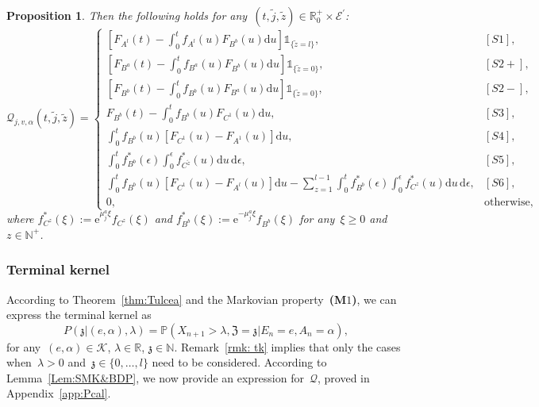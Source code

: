 \documentclass{amsart}[11pt]
\numberwithin{equation}{section}
\newtheorem{proposition}[theorem]{Proposition}
\theoremstyle{definition}
\newtheorem{remark}[theorem]{Remark}
\newcommand{\ind}{\mathds{1}} %
\newcommand{\RR}{\mathbb{R}}
\newcommand{\PP}{\mathbb{P}}
\newcommand{\NN}{\mathbb{N}}
\newcommand{\Kk}{\mathcal{K}}
\newcommand{\D}{\mathrm{d}}
\newcommand{\Ee}{\mathcal{E}}
\newcommand{\E}{\mathrm{e}}
\newcommand{\ZZ}{\mathfrak{Z}}
\newcommand{\zz}{\mathfrak{z}}
\newcommand{\Qq}{\mathcal{Q}}
\begin{document}
\begin{proposition}
Then the following holds for any~$(t, \tilde{j}, \tilde{z})\in\RR^+_0\times \Ee^\prime$:
\begin{equation*}
\Qq_{j, v, \alpha}\left(t, \tilde{j}, \tilde{z}\right)
 = 
\left\{
\begin{array}{ll}
\displaystyle\left[F_{{A}^{l}}(t) - \int_0^t f_{{A}^{l}}(u) F_{{B}^b}(u) \D u\right]
\ind_{\{\tilde{z} = {l}\}}, & [S1],\\
\displaystyle \left[F_{{B}^a}(t) - \int_0^t f_{{B}^a}(u)F_{{B}^b}(u)\D u\right]
\ind_{\{\tilde{z} = 0\}}, 
&  [S2+],\\
\displaystyle \left[F_{{B}^b}(t) - \displaystyle \int_0^t f_{{B}^b}(u) F_{{B}^a}(u)\D u\right]
\ind_{\{\tilde{z} = 0\}}, 
&   [S2-],\\
\displaystyle F_{{B}^b}(t) - \int_0^t f_{{B}^b}(u) F_{{C}^{1}}(u) \D u, &  [S3],\\
\displaystyle \int_0^t f_{{B}^b}(u)\left[F_{{C}^{1}}(u) - F_{{A}^{1}}(u)\right]\D u, &  [S4],\\
\displaystyle \int_0^t f^*_{B^b}(\epsilon)\int_0^\epsilon f^*_{C^{\tilde{z}}}(u)\D u\, \D\epsilon, &  [S5],\\
\displaystyle\int_0^t f_{{B}^b}(u)\left[F_{C^1}(u) - F_{A^l}(u)\right]\D u-
\displaystyle\sum_{z = 1}^{{l}-1}
\int_0^t f^*_{B^b}(\epsilon)\int_0^\epsilon f^*_{C^{z}}(u)\D u\, \D\epsilon, &  [S6],\\
0,&\text{otherwise},
\end{array}
\right.
\end{equation*}
where 
$f^{*}_{{C}^{{z}}}(\xi) := \E^{\mu_{{j}}^a \xi}f_{{C}^{{z}}}(\xi)$ 
and 
$f^{*}_{{B}^b}(\xi) := \E^{-\mu_{{j}}^a \xi}f_{{B}^b}(\xi)$
for any~$\xi\geq 0$ and~$z\in\NN^+$.
\end{proposition}
\subsubsection{Terminal kernel}
According to Theorem~\ref{thm:Tulcea} and the Markovian property~\textbf{(M$1$)},
we can express the terminal kernel as
\begin{equation}
P(\zz\lvert (e, \alpha), \lambda) = 
\PP(X_{n+1} > \lambda, \ZZ = \zz\lvert E_n = e, A_n = \alpha),
\end{equation}
for any~$(e, \alpha)\in \Kk$, $\lambda\in\RR$, $\zz\in\NN$.
Remark~\ref{rmk: tk} implies that only the cases when~$\lambda >0$ and~$\zz \in \{0, \dots, l \}$
need to be considered.
According to Lemma~\ref{Lem:SMK&BDP}, we now provide an expression for~${\Qq}$, 
proved in Appendix~\ref{app:Pcal}.
\end{document}
